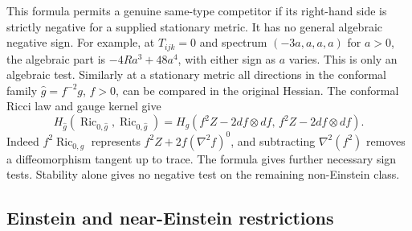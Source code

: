 \documentclass[11pt,letterpaper]{article}
\numberwithin{equation}{section}
\theoremstyle{remark}
\DeclareMathOperator{\Ric}{Ric}
\begin{document}
This formula permits a genuine same-type competitor if its
right-hand side is strictly negative for a supplied stationary
metric. It has no general algebraic negative sign. For example,
at \(T_{ijk}=0\) and spectrum \((-3a,a,a,a)\) for \(a>0\), the
algebraic part is \(-4Ra^3+48a^4\), with either sign as \(a\)
varies. This is only an algebraic test. Similarly at a stationary
metric all directions in the conformal family \(\widehat g=f^{-2}g\),
\(f>0\), can be compared in the original Hessian. The conformal
Ricci law and gauge kernel give
\[
 H_{\widehat g}(\Ric_{0,\widehat g},\Ric_{0,\widehat g})
 =H_g(f^2Z-2df\otimes df,\,f^2Z-2df\otimes df).
\]
Indeed \(f^2\Ric_{0,\widehat g}\) represents \(f^2Z+
2f(\nabla^2f)^0\), and subtracting \(\nabla^2(f^2)\) removes a
diffeomorphism tangent up to trace. The formula gives further
necessary sign tests. Stability alone gives no negative test
on the remaining non-Einstein class.



\subsection{Einstein and near-Einstein restrictions}
\end{document}
